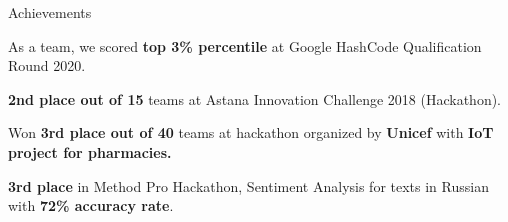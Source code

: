 \documentclass{resume} %
\begin{document}
\begin{rSection}{Achievements}

\begin{rCuteList}
\item As a team, we scored \textbf{top 3\% percentile} at Google HashCode Qualification Round 2020.
\item \textbf{2nd place out of 15} teams at Astana Innovation Challenge 2018 (Hackathon).
\item Won \textbf{3rd place out of 40} teams at hackathon organized by \textbf{Unicef} with \textbf{IoT project for pharmacies.}
\item \textbf{3rd place} in Method Pro Hackathon, Sentiment Analysis for texts in Russian with \textbf{72\% accuracy rate}. 
\end{rCuteList}


\end{rSection}










\end{document}

